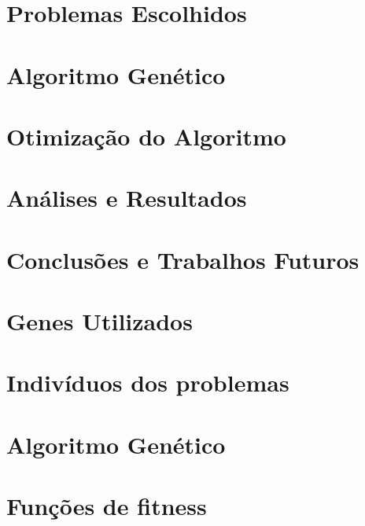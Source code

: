 \documentclass[12pt,plainheader,pnumplain]{abnt}
\newcommand{\oes}{\~oes }
\newcommand{\src}{src/experiments}
\begin{document}
\chapter{Problemas Escolhidos}


\chapter{Algoritmo Gen\'etico}


\chapter{Otimização do Algoritmo}


\chapter{An\'alises e Resultados}


\chapter{Conclus\oes e Trabalhos Futuros}





\appendix

\newpage
\chapter{Genes Utilizados}
\label{appendix:genes}


\newpage
\chapter{Indivíduos dos problemas}
\label{appendix:genes}


\newpage
\chapter{Algoritmo Genético}
\label{appendix:geneflow}


\newpage
\chapter{Funções de fitness}
\label{appendix:fitness}

\end{document}
